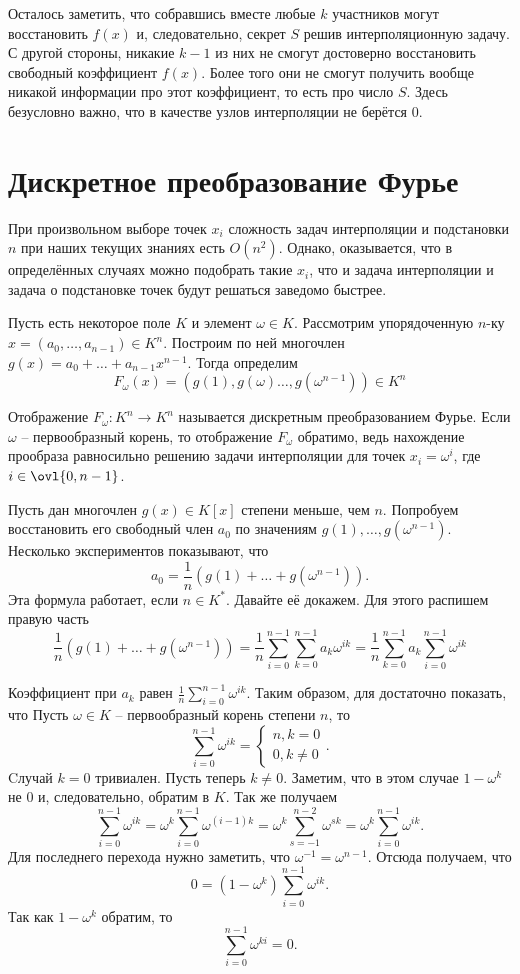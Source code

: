 Осталось заметить, что собравшись вместе любые $k$ участников могут восстановить  $f(x)$
и, следовательно, секрет $S$ решив интерполяционную задачу. С другой стороны, никакие $k-1$ из них не смогут достоверно восстановить свободный коэффициент $f(x)$. Более того они не смогут получить вообще никакой информации про этот коэффициент, то есть про число $S$. Здесь безусловно важно, что в качестве узлов интерполяции не берётся 0.


\section{Дискретное преобразование Фурье}

При произвольном выборе точек $x_i$ сложность задач интерполяции и подстановки $n$ при наших текущих знаниях есть $O(n^2)$. Однако, оказывается, что в определённых случаях можно подобрать такие $x_i$, что и задача интерполяции и задача о подстановке точек будут решаться заведомо быстрее.

Пусть есть некоторое поле $K$ и элемент $\omega \in K$. Рассмотрим упорядоченную $n$-ку $x=(a_0,\dots,a_{n-1})\in K^n$. Построим по ней многочлен $g(x)=a_0+\dots+a_{n-1}x^{n-1}$. Тогда определим $$F_{\omega}(x)=(g(1), g(\omega)\dots,g(\omega^{n-1}))\in K^n$$


Отображение $F_{\omega}\colon K^n \to K^n$ называется дискретным преобразованием Фурье. Если $\omega$ -- первообразный корень, то отображение $F_{\omega}$ обратимо, ведь нахождение прообраза равносильно решению задачи интерполяции для точек $x_i=\omega^i$, где $i\in \ovl{0,n-1}$. 

Пусть дан многочлен $g(x) \in K[x]$ степени меньше, чем $n$. Попробуем восстановить его свободный член $a_0$ по значениям $g(1),\dots,g(\omega^{n-1})$. Несколько экспериментов показывают, что 
$$a_0=\frac{1}{n}\left(g(1)+\dots+g(\omega^{n-1})\right).$$
Эта формула работает, если $n \in K^*$. Давайте её докажем. Для этого распишем правую часть
$$\frac{1}{n}\left(g(1)+\dots+g(\omega^{n-1})\right)=\frac{1}{n}\sum_{i=0}^{n-1} \sum_{k=0}^{n-1} a_k \omega^{ik}=\frac{1}{n}\sum_{k=0}^{n-1} a_k\sum_{i=0}^{n-1} \omega^{ik}$$

Коэффициент при $a_k$ равен $\frac{1}{n} \sum_{i=0}^{n-1}\omega^{ik}$. Таким образом, для  достаточно показать, что
\lm Пусть $\omega \in K$ -- первообразный корень степени $n$, то $$\sum_{i=0}^{n-1}\omega^{ik}=\begin{cases} n, k=0\\
0, k\neq 0
\end{cases}.$$
\elm
\proof Cлучай $k=0$ тривиален. Пусть теперь $k\neq 0$. Заметим, что в этом случае $1-\omega^{k}$ не $0$ и, следовательно, обратим в $K$. Так же получаем
$$\sum_{i=0}^{n-1}\omega^{ik}=\omega^{k}\sum_{i=0}^{n-1} \omega^{(i-1)k}=\omega^{k}\sum_{s=-1}^{n-2} \omega^{sk}=\omega^{k}\sum_{i=0}^{n-1} \omega^{ik}.$$
Для последнего перехода нужно заметить, что $\omega^{-1}=\omega^{n-1}$. Отсюда получаем, что 
$$0=(1-\omega^k)\sum_{i=0}^{n-1} \omega^{ik}.$$
Так как $1-\omega^k$ обратим, то  $$\sum_{i=0}^{n-1}\omega^{ki}=0.$$
\endproof

